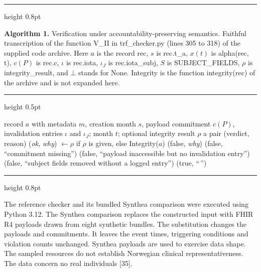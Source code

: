 \documentclass[preprint,review,12pt]{elsarticle}
\newcommand{\algcapfont}{\footnotesize\linespread{1.05}\selectfont}
\begin{document}
\begin{algorithm*}[!tbp]
\captionsetup{justification=raggedright,singlelinecheck=false}
\hrule height 0.8pt\vspace{3pt}
{\algcapfont\raggedright \textbf{Algorithm 1.} Verification under accountability-preserving
semantics. Faithful transcription of the function V\_II in
trf\_checker.py (lines 305 to 318) of the supplied code archive. Here
\(a\) is the record rec, \(s\) is rec.t\_a, \(x(t)\) is alpha(rec, t),
\(c(P)\) is rec.c, \(\iota\) is rec.iota, \(\iota_J\) is rec.iota\_subj,
\(S\) is SUBJECT\_FIELDS, \(\rho\) is integrity\_result, and \(\bot\)
stands for None. Integrity is the function integrity(rec) of the archive
and is not expanded here.\par}
\vspace{2pt}\hrule height 0.5pt\vspace{3pt}
\small\linespread{1.05}\selectfont\begin{algorithmic}[1]
\Require record \(a\) with metadata \(m\), creation month \(s\), payload commitment \(c(P)\), invalidation entries \(\iota\) and \(\iota_J\); month \(t\); optional integrity result \(\rho\)
\Ensure a pair (verdict, reason)
\State (\emph{ok}, \emph{why}) \(\leftarrow \rho\) if \(\rho\) is given, else Integrity(\(a\))
\State \Return (false, \emph{why})
\EndIf
{}
\State \Return (false, ``commitment missing'')
\EndIf
{}
\State \Return (false, ``payload inaccessible but no invalidation entry'')
\EndIf
{}
\State \Return (false, ``subject fields removed without a logged entry'')
\EndIf
\State \Return (true, ``\,'')
\end{algorithmic}
\vspace{2pt}\hrule height 0.8pt
\end{algorithm*}

The reference checker and its bundled Synthea comparison were executed
using Python 3.12. The Synthea comparison replaces the constructed input
with FHIR R4 payloads drawn from eight synthetic bundles. The
substitution changes the payloads and commitments. It leaves the event
times, triggering conditions and violation counts unchanged. Synthea
payloads are used to exercise data shape. The sampled resources do not
establish Norwegian clinical representativeness. The data concern no
real individuals {[}35{]}.
\end{document}
